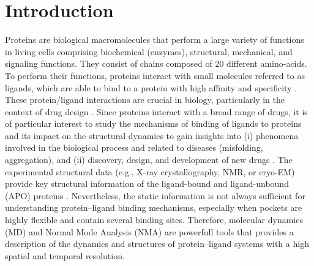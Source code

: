 \chapter{Introduction}
Proteins are biological macromolecules that perform a large variety of functions in living cells comprising biochemical (enzymes), structural, mechanical, and signaling functions. They consist of chains composed of 20 different amino-acids. To perform their functions, proteins interact with small molecules referred to as ligands, which are able to bind to a protein with high affinity and specificity \cite{du2016insights}. These protein/ligand interactions are crucial in biology, particularly in the context of drug design \cite{li2019predicting}. Since proteins interact with a broad range of drugs, it is of particular interest to study the mechanisms of binding of ligands to proteins and its impact on the structural dynamics to gain insights into (i) phenomena involved in the biological process and related to diseases \cite{silva2010ligand} (misfolding, aggregation), and (ii) discovery, design, and development of new drugs \cite{payandeh2021ligand}. The experimental structural data (e.g., X-ray crystallography, NMR, or cryo-EM) provide key structural information of the ligand-bound and ligand-unbound (APO) proteins \cite{chakraborti2021all}. Nevertheless, the static information is not always sufficient for understanding protein–ligand binding mechanisms, especially when pockets are highly flexible and contain several binding sites. Therefore, molecular dynamics (MD) and Normal Mode Analysis (NMA) are powerfull tools that provides a description of the dynamics and structures of protein–ligand systems with a high spatial and temporal resolution.
